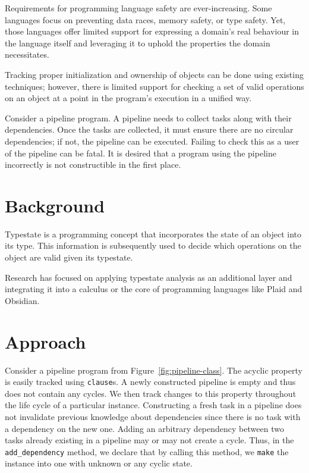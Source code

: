 \documentclass[sigconf,screen,nonacm]{acmart}
\begin{document}
Requirements for programming language safety are ever-increasing. Some languages focus on preventing data races, memory safety, or type safety. Yet, those languages offer limited support for expressing a domain's real behaviour in the language itself and leveraging it to uphold the properties the domain necessitates.


\FloatBarrier

Tracking proper initialization and ownership of objects can be done using existing techniques; however, there is limited support for checking a set of valid operations on an object at a point in the program's execution in a unified way.

Consider a pipeline program. A pipeline needs to collect tasks along with their dependencies. Once the tasks are collected, it must ensure there are no circular dependencies; if not, the pipeline can be executed. Failing to check this as a user of the pipeline can be fatal. It is desired that a program using the pipeline incorrectly is not constructible in the first place.

\section{Background}

Typestate\cite{10.1145/2629609}\cite{6312929} is a programming concept that incorporates the state of an object into its type. This information is subsequently used to decide which operations on the object are valid given its typestate.

Research has focused on applying typestate analysis as an additional layer\cite{10.1007/978-3-030-78142-2_8}\cite{10.1007/978-3-540-24851-4_21}\cite{Trindade_2020} and integrating it into a calculus\cite{10.1145/3689763} or the core of programming languages like Plaid\cite{10.1145/2629609}\cite{10.1145/1639950.1640073} and Obsidian\cite{10.1145/3417516}.

\section{Approach}

Consider a pipeline program from Figure~\ref{fig:pipeline-class}. The acyclic property is easily tracked using \verb|clause|s. A newly constructed pipeline is empty and thus does not contain any cycles. We then track changes to this property throughout the life cycle of a particular instance. Constructing a fresh task in a pipeline does not invalidate previous knowledge about dependencies since there is no task with a dependency on the new one. Adding an arbitrary dependency between two tasks already existing in a pipeline may or may not create a cycle. Thus, in the \verb|add_dependency| method, we declare that by calling this method, we \verb|make| the instance into one with unknown or any cyclic state.
\end{document}
